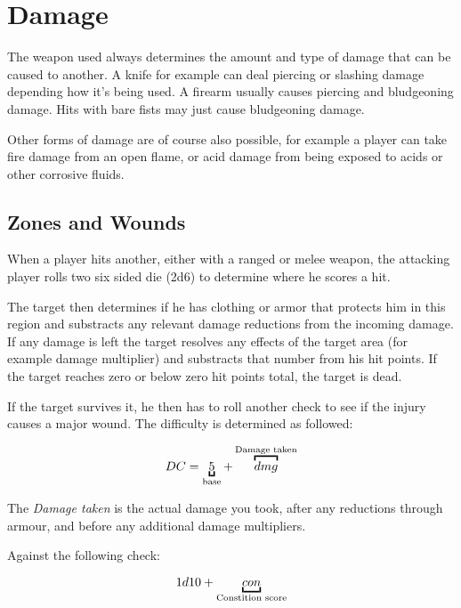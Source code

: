 \section{Damage}
\label{sec:6-Damage}

The weapon used always determines the amount and type of damage that can be
caused to another. A knife for example can deal piercing or slashing damage
depending how it's being used. A firearm usually causes piercing and
bludgeoning damage. Hits with bare fists may just cause bludgeoning damage.

Other forms of damage are of course also possible, for example a player can
take fire damage from an open flame, or acid damage from being exposed to
acids or other corrosive fluids.

\subsection{Zones and Wounds}
\label{sub:6-Zones and Wounds}

When a player hits another, either with a ranged or melee weapon, the attacking
player rolls two six sided die (2d6) to determine where he scores a hit.

The target then determines if he has clothing or armor that protects him in this
region and substracts any relevant damage reductions from the incoming damage.
If any damage is left the target resolves any effects of the target area (for
example damage multiplier) and substracts that number from his hit points. If
the target reaches zero or below zero hit points total, the target is dead.

If the target survives it, he then has to roll another check to see if the
injury causes a major wound. The difficulty is determined as followed:

\[
DC = \ub{5}{base} + \ob{dmg}{Damage taken}
\]

The \emph{Damage taken} is the actual damage you took, after any reductions
through armour, and before any additional damage multipliers.

Against the following check:

\[
1d10 + \ub{con}{Constition score}
\]

